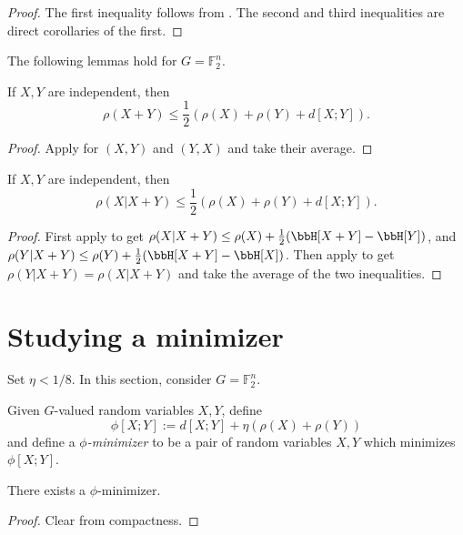 \begin{proof}\leanok
  The first inequality follows from . The second and third inequalities are direct corollaries of the first.
\end{proof}

The following lemmas hold for $G=\mathbb{F}_2^n$.

\begin{lemma}\label{rho-sums-sym}\leanok  If $X,Y$ are independent, then
  $$ \rho(X+Y) \leq \frac{1}{2}(\rho(X)+\rho(Y) + d[X;Y]).$$
\end{lemma}
\begin{proof}\leanok
Apply  for $(X,Y)$ and $(Y,X)$ and take their average.
\end{proof}

\begin{lemma}\label{rho-cond-sym}\leanok
  If $X,Y$ are independent, then
  $$ \rho(X | X+Y) \leq \frac{1}{2}(\rho(X)+\rho(Y) + d[X;Y]).$$
\end{lemma}
\begin{proof}\leanok
  First apply  to get $\rho(X|X+Y)\le \rho(X) + \frac{1}{2}(\bbH[X+Y]-\bbH[Y])$, and $\rho(Y|X+Y)\le \rho(Y)+\frac{1}{2}(\bbH[X+Y]-\bbH[X])$. Then apply  to get $\rho(Y|X+Y)=\rho(X|X+Y)$ and take the average of the two inequalities.
\end{proof}

\section{Studying a minimizer}

Set $\eta < 1/8$. In this section, consider $G=\mathbb{F}_2^n$.

\begin{definition}\label{phi-min-def}\leanok  Given $G$-valued random variables $X,Y$, define
$$ \phi[X;Y] := d[X;Y] + \eta(\rho(X) + \rho(Y))$$
and define a \emph{$\phi$-minimizer} to be a pair of random variables $X,Y$ which minimizes $\phi[X;Y]$.
\end{definition}

\begin{lemma}\label{phi-min-exist}\leanok  There exists a $\phi$-minimizer.
\end{lemma}

\begin{proof}\leanok Clear from compactness.
\end{proof}

